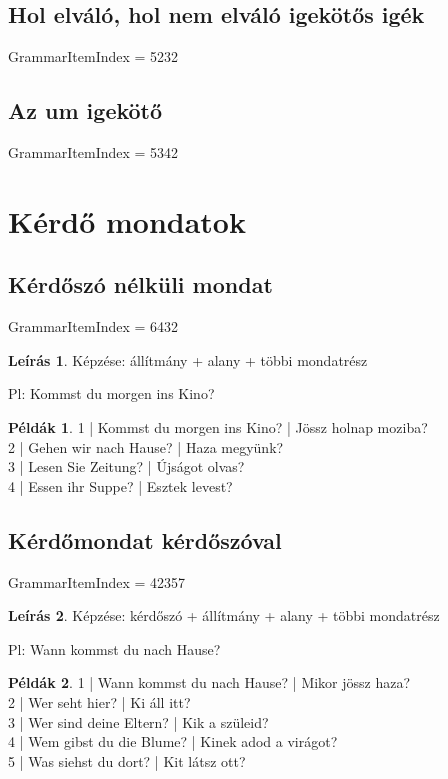 \documentclass{article}
\theoremstyle{definition}
\newtheorem*{exmp}{Példák}
\newtheorem*{desc}{Leírás}
\begin{document}
\subsection{Hol elváló, hol nem elváló igekötős igék}

GrammarItemIndex = 5232

\subsection{Az um igekötő}

GrammarItemIndex = 5342

\section{Kérdő mondatok}

\subsection{Kérdőszó nélküli mondat}

GrammarItemIndex = 6432

\begin{desc}
Képzése: állítmány + alany + többi mondatrész

Pl: Kommst du morgen ins Kino?
\end{desc}

\begin{exmp}
1 | Kommst du morgen ins Kino? | Jössz holnap moziba?\\
2 | Gehen wir nach Hause? | Haza megyünk?\\
3 | Lesen Sie Zeitung? | Újságot olvas?\\
4 | Essen ihr Suppe? | Esztek levest?\\
\end{exmp}

\subsection{Kérdőmondat kérdőszóval}

GrammarItemIndex = 42357

\begin{desc}
Képzése: kérdőszó + állítmány + alany + többi mondatrész

Pl: Wann kommst du nach Hause?
\end{desc}

\begin{exmp}
1 | Wann kommst du nach Hause? | Mikor jössz haza?\\
2 | Wer seht hier? | Ki áll itt?\\
3 | Wer sind deine Eltern? | Kik a szüleid?\\
4 | Wem gibst du die Blume? | Kinek adod a virágot?\\
5 | Was siehst du dort? | Kit látsz ott?\\
\end{exmp}
\end{document}
